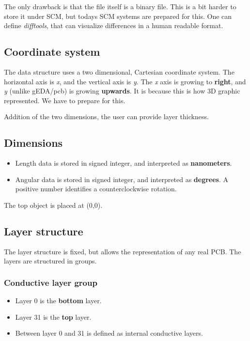 \documentclass[12pt]{article}
\begin{document}
The only drawback is that the file itself is a binary file. This is a bit
harder to store it under SCM, but todays SCM systems are prepared for this.
One can define \textit{difftools}, that can visualize differences in a human
readable format.

\subsection{Coordinate system}\label{coordinate-system}

The data structure uses a two dimensional, Cartesian coordinate system.
The horizontal axis is \emph{x}, and the vertical axis is \emph{y}. The
\emph{x} axis is growing to \textbf{right}, and \emph{y} (unlike
gEDA/pcb) is growing \textbf{upwards}. It is because this is how 3D
graphic represented. We have to prepare for this.

Addition of the two dimensions, the user can provide layer thickness.

\subsection{Dimensions}\label{dimensions}

\begin{itemize}
\item
  Length data is stored in signed integer, and interpreted as
\textbf{nanometers}.
\item
  Angular data is stored in signed integer, and interpreted as
\textbf{degrees}.
  A positive number identifies a counterclockwise rotation.
\end{itemize}

The top object is placed at (0,0).

\subsection{Layer structure}\label{layer-structure}

The layer structure is fixed, but allows the representation of any real
PCB. The layers are structured in groups.

\subsubsection{Conductive layer group}\label{conductive-layer-group}

\begin{itemize}
\item
  Layer 0 is the \textbf{bottom} layer.
\item
  Layer 31 is the \textbf{top} layer.
\item
  Between layer 0 and 31 is defined as internal conductive layers.
\end{itemize}
\end{document}
